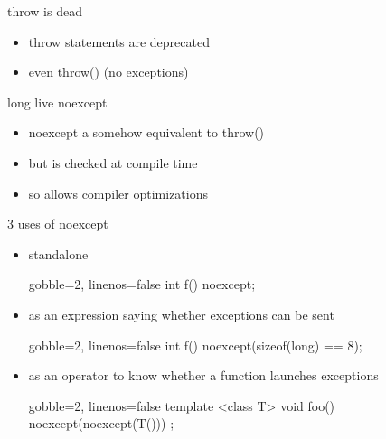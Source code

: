 \begin{frame}[fragile]
  \begin{block}{throw is dead}
    \begin{itemize}
    \item throw statements are deprecated
    \item even throw() (no exceptions)
    \end{itemize}
  \end{block}
  \pause
  \begin{exampleblock}{long live noexcept}
    \begin{itemize}
    \item noexcept a somehow equivalent to throw()
    \item but is checked at compile time
    \item so allows compiler optimizations
    \end{itemize}
  \end{exampleblock}
\end{frame}

\begin{frame}[fragile]
  \begin{block}{3 uses of noexcept}
    \begin{itemize}
    \item standalone
      \begin{cppcode*}{gobble=2, linenos=false}
        int f() noexcept;
      \end{cppcode*}
    \item as an expression saying whether exceptions can be sent
      \begin{cppcode*}{gobble=2, linenos=false}
        int f() noexcept(sizeof(long) == 8);
      \end{cppcode*}
    \item as an operator to know whether a function launches exceptions
      \begin{cppcode*}{gobble=2, linenos=false}
        template <class T> void foo()
             noexcept(noexcept(T())) {};
      \end{cppcode*}
   \end{itemize}
  \end{block}
\end{frame}
